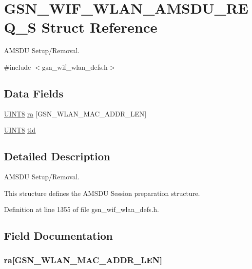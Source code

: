 \hypertarget{a00367}{
\section{GSN\_\-WIF\_\-WLAN\_\-AMSDU\_\-REQ\_\-S Struct Reference}
\label{a00367}
}


AMSDU Setup/Removal.  




{\ttfamily \#include $<$gsn\_\-wif\_\-wlan\_\-defs.h$>$}

\subsection*{Data Fields}
\begin{DoxyCompactItemize}
\item 
\hyperlink{a00660_gab27e9918b538ce9d8ca692479b375b6a}{UINT8} \hyperlink{a00367_a1d97eb2e070b4a95218b41f6abbff9d7}{ra} \mbox{[}GSN\_\-WLAN\_\-MAC\_\-ADDR\_\-LEN\mbox{]}
\item 
\hyperlink{a00660_gab27e9918b538ce9d8ca692479b375b6a}{UINT8} \hyperlink{a00367_abf69ed815c8482f9995e41bc0aff9043}{tid}
\end{DoxyCompactItemize}


\subsection{Detailed Description}
AMSDU Setup/Removal. 

This structure defines the AMSDU Session preparation structure. 

Definition at line 1355 of file gsn\_\-wif\_\-wlan\_\-defs.h.



\subsection{Field Documentation}
\hypertarget{a00367_a1d97eb2e070b4a95218b41f6abbff9d7}{
\subsubsection[{ra}]{ {\bf ra}\mbox{[}GSN\_\-WLAN\_\-MAC\_\-ADDR\_\-LEN\mbox{]}}}
\label{a00367_a1d97eb2e070b4a95218b41f6abbff9d7}


